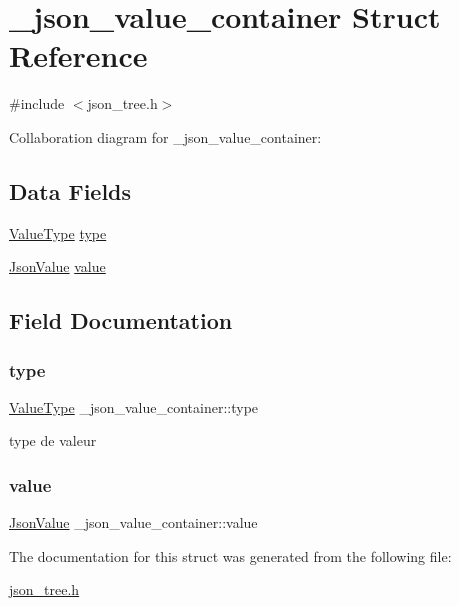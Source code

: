 \hypertarget{struct__json__value__container}{}\section{\+\_\+json\+\_\+value\+\_\+container Struct Reference}
\label{struct__json__value__container}


{\ttfamily \#include $<$json\+\_\+tree.\+h$>$}



Collaboration diagram for \+\_\+json\+\_\+value\+\_\+container\+:
\subsection*{Data Fields}
\begin{DoxyCompactItemize}
\item 
\hyperlink{json__tree_8h_a4240fa9f317a2e54e34c73cc42f9f4ed}{Value\+Type} \hyperlink{struct__json__value__container_a21cdc2a7c5df1f10e0b61ee6f99c3bcc}{type}
\item 
\hyperlink{unionJsonValue}{Json\+Value} \hyperlink{struct__json__value__container_a73ad9502b6b086e7429f69817bc7ba4b}{value}
\end{DoxyCompactItemize}


\subsection{Field Documentation}
\mbox{\label{struct__json__value__container_a21cdc2a7c5df1f10e0b61ee6f99c3bcc}} 
\subsubsection{\texorpdfstring{type}{type}}
{\footnotesize\ttfamily \hyperlink{json__tree_8h_a4240fa9f317a2e54e34c73cc42f9f4ed}{Value\+Type} \+\_\+json\+\_\+value\+\_\+container\+::type}

type de valeur \mbox{\label{struct__json__value__container_a73ad9502b6b086e7429f69817bc7ba4b}} 
\subsubsection{\texorpdfstring{value}{value}}
{\footnotesize\ttfamily \hyperlink{unionJsonValue}{Json\+Value} \+\_\+json\+\_\+value\+\_\+container\+::value}



The documentation for this struct was generated from the following file\+:\begin{DoxyCompactItemize}
\item 
\hyperlink{json__tree_8h}{json\+\_\+tree.\+h}\end{DoxyCompactItemize}
